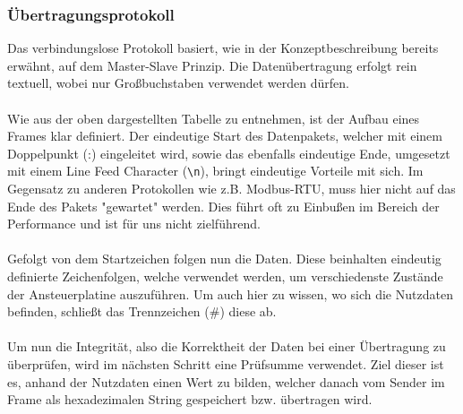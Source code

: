\subsubsection{Übertragungsprotokoll} \label{sssec:uebertragungsprotokoll}
\begin{table}[H]
    \centering
{}
    \caption{Visualisierung des Datenakets}
\end{table}
Das verbindungslose Protokoll basiert, wie in der Konzeptbeschreibung bereits erwähnt, auf dem Master-Slave Prinzip.
Die Datenübertragung erfolgt rein textuell, wobei nur Großbuchstaben verwendet werden dürfen.\\\\
Wie aus der oben dargestellten Tabelle zu entnehmen, ist der Aufbau eines Frames klar definiert.
Der eindeutige Start des Datenpakets, welcher mit einem Doppelpunkt (:) eingeleitet wird, sowie das ebenfalls eindeutige Ende, umgesetzt mit einem Line Feed Character (\verb!\n!), bringt eindeutige Vorteile mit sich.
Im Gegensatz zu anderen Protokollen wie z.B. Modbus-RTU, muss hier nicht auf das Ende des Pakets "gewartet" werden.
Dies führt oft zu Einbußen im Bereich der Performance und ist für uns nicht zielführend.\\\\
Gefolgt von dem Startzeichen folgen nun die Daten.
Diese beinhalten eindeutig definierte Zeichenfolgen, welche verwendet werden, um verschiedenste Zustände der Ansteuerplatine auszuführen.
Um auch hier zu wissen, wo sich die Nutzdaten befinden, schließt das Trennzeichen (#) diese ab.\\\\
Um nun die Integrität, also die Korrektheit der Daten bei einer Übertragung zu überprüfen, wird im nächsten Schritt eine Prüfsumme verwendet.
Ziel dieser ist es, anhand der Nutzdaten einen Wert zu bilden, welcher danach vom Sender im Frame als hexadezimalen String gespeichert bzw. übertragen wird.
